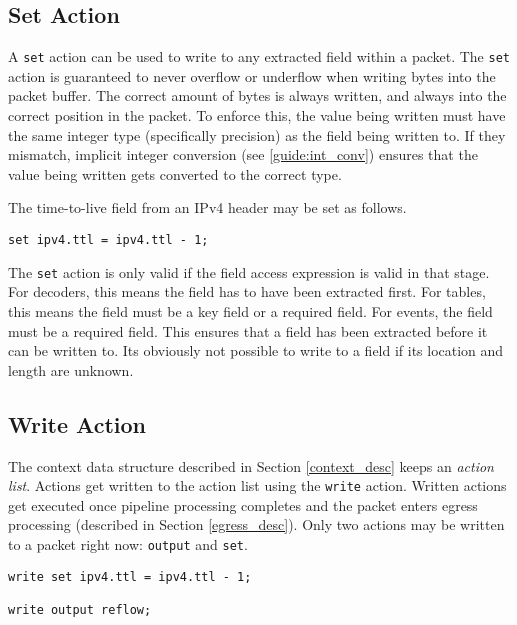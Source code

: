 \subsection{Set Action} \label{tut:set_action}

A \texttt{set} action can be used to write to any extracted field within a
packet. 
The \texttt{set} action is guaranteed to never overflow or underflow when
writing bytes into the packet buffer.
The correct amount of bytes is always written, and always into the correct position in the packet.
To enforce this, the value being written must have the same integer type (specifically precision) as the field being written to. If they mismatch, implicit integer conversion (see \ref{guide:int_conv}) ensures that the value being written gets converted to the correct type.

The time-to-live field from an IPv4 header may be set as follows.

\begin{codepage}
\begin{lstlisting}
set ipv4.ttl = ipv4.ttl - 1;
\end{lstlisting}
\end{codepage}

The \texttt{set} action is only valid if the field access expression is valid in
that stage. For decoders, this means the field has to have been extracted first.
For tables, this means the field must be a key field or a required field. For
events, the field must be a required field. This ensures that a field
has been extracted before it can be written to. Its obviously not possible
to write to a field if its location and length are unknown.

\subsection{Write Action} \label{tut:write_action}

The context data structure described in Section \ref{context_desc} keeps an
\textit{action list}. Actions get written to the action list using the
\texttt{write} action. Written actions get executed once pipeline processing
completes and the packet enters egress processing (described in Section \ref{egress_desc}).
Only two actions may be written to a packet right now: \texttt{output} and \texttt{set}.

\begin{codepage}
\begin{lstlisting}
write set ipv4.ttl = ipv4.ttl - 1;

write output reflow;
\end{lstlisting}
\end{codepage}

